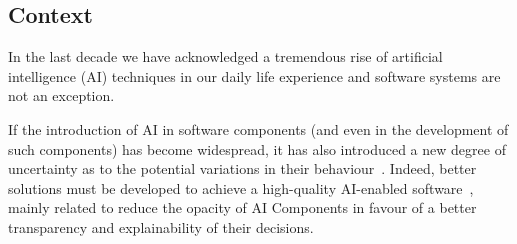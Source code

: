 \hrulefill
\subsection{Context} \label{sec:intro}

In the last decade we have acknowledged a tremendous {rise of artificial intelligence} (AI) techniques in our daily life experience and software systems are not an exception. %

If the introduction of AI in software components (and even in the development of such components) has become widespread, it has also introduced a new degree of {uncertainty as to the potential variations in their behaviour}~\cite{hllermeier2019-aleatoric-and-epistemic-uncertiainty-in-ml}. %
Indeed, better solutions must be developed to achieve a high-quality AI-enabled software~\cite{ozkaya2020-differences-in-AI-enabled-engineering}, mainly related to reduce the opacity of AI Components in favour of a better transparency and explainability of their decisions.

